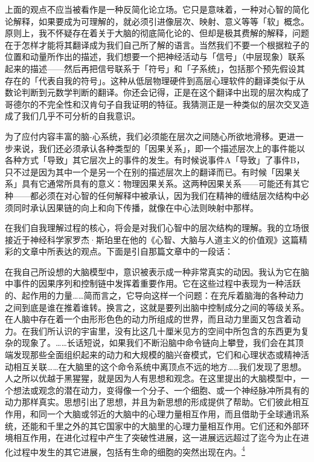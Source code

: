 \documentclass[
  12pt,
  twoside,
  openright,
  oldfontcommands,
]{memoir}
\newenvironment{fsquote}{%
  \begin{mdframed}[style=gebquote]\kaitifamily\small%
}{%
  \end{mdframed}%
}
\begin{document}
上面的观点不应当被看作是一种反简化论立场。它只是意味着，一种对心智的简化论解释，如果要成为可理解的，就必须引进像层次、映射、意义等等「软」概念。原则上，我不怀疑存在着关于大脑的彻底简化论的、但却是极其费解的解释，问题在于怎样才能将其翻译成为我们自己所了解的语言。当然我们不要一个根据粒子的位置和动量所作出的描述，我们想要一个把神经活动与「信号」（中层现象）联系起来的描述------然后再把信号联系于「符号」和「子系统」，包括那个预先假设其存在的「代表自我的符号」。这种从低层物理硬件到高层心理软件的翻译类似于从数论判断到元数学判断的翻译。你还会记得，正是在这个翻译中出现的层次构成了哥德尔的不完全性和汉肯句子自我证明的特征。我猜测正是一种类似的层次交叉造成了我们几乎不可分析的自我意识。

为了应付内容丰富的脑-心系统，我们必须能在层次之间随心所欲地滑移。更进一步来说，我们还必须承认各种类型的「因果关系」，即一个描述层次上的事件能以各种方式「导致」其它层次上的事件的发生。有时候说事件A「导致」了事件B，只不过是因为其中一个是另一个在别的描述层次上的翻译而已。有时候「因果关系」具有它通常所具有的意义：物理因果关系。这两种因果关系------可能还有其它种------都必须在对心智的任何解释中被承认，因为我们在精神的缠结层次结构中必须同时承认因果链的向上和向下传播，就像在中心法则映射中那样。

在我们自我理解过程的核心，将会是对我们心智中的层次结构的理解。我的立场很接近于神经科学家罗杰·斯珀里在他的《心智、大脑与人道主义的价值观》这篇精彩的文章中所表达的观点。下面是引自那篇文章中的一段话：

\begin{fsquote}
在我自己所设想的大脑模型中，意识被表示成一种非常真实的动因。我认为它在脑中事件的因果序列和控制链中发挥着重要作用。它在这些过程中表现为一种活跃的、起作用的力量\ldots\ldots 简而言之，它导向这样一个问题：在充斥着脑海的各种动力之间到底是谁在推着谁转。换言之，这就是要列出脑中控制成分之间的等级关系。在人脑中存在着一个由形形色色的动力所组成的世界，而且动力里面又包含着动力。在我们所认识的宇宙里，没有比这几十厘米见方的空间中所包含的东西更为复杂的现象了。\ldots\ldots 长话短说，如果我们不断沿脑中命令链向上攀登，我们会在其顶端发现那些全面组织起来的动力和大规模的脑兴奋模式，它们和心理状态或精神活动相互关联\ldots\ldots 在大脑里的这个命令系统中离顶点不远的地方\ldots\ldots 我们发现了思想。人之所以优越于黑猩猩，就是因为人有思想和观念。在这里提出的大脑模型中，一个想法或观念的潜在动力，变得像一个分子、一个细胞、或一个神经脉冲所具有的动力那样真实。思想引出了思想，并且为新思想的形成提供了帮助。它们彼此相互作用，和同一个大脑或邻近的大脑中的心理力量相互作用，而且借助于全球通讯系统，还能和千里之外的其它国家中的大脑里的心理力量相互作用。它们还和外部环境相互作用，在进化过程中产生了突破性进展，这一进展远远超过了迄今为止在进化过程中发生的其它进展，包括有生命的细胞的突然出现在内。\hyperref[fn:Chapter20-4]{\textsuperscript{4}}
\end{fsquote}
\end{document}
